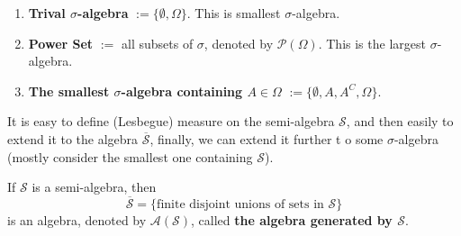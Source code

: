 


\begin{example}
    \begin{enumerate}
        \item \textbf{Trival $\sigma$-algebra} $:=\{\emptyset,\Omega\}$. This is smallest $\sigma$-algebra.
        \item \textbf{Power Set} $:=$ all subsets of $\sigma$, denoted by $\mathcal{P}(\Omega)$. This is the largest $\sigma$-algebra.
        \item \textbf{The smallest $\sigma$-algebra containing $A\in\Omega$} $:=\{\emptyset,A,A^C,\Omega\}$.
    \end{enumerate}
\end{example}

It is easy to define (Lesbegue) measure on the semi-algebra  $\mathcal{S}$, and then easily to extend it to the algebra $\overline{\mathcal{S}}$, finally, we can extend it further t o some $\sigma$-algebra (mostly consider the smallest one containing $\mathcal{S}$).

\begin{lemma}
    If $\mathcal{S}$ is a semi-algebra, then $$\overline{\mathcal{S}}=\{\text{finite disjoint unions of sets in }\mathcal{S}\}$$ is an algebra, denoted by $\mathcal{A}(\mathcal{S})$, called \textbf{the algebra generated by $\mathcal{S}$}.
\end{lemma}

